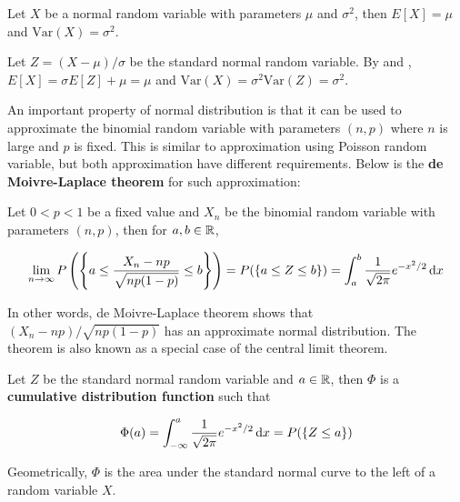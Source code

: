 \documentclass[a4paper,12pt]{article}
\begin{document}
\begin{thm}
  Let $X$ be a normal random variable with parameters $\mu$ and $\sigma^{2}$, then $E[X]=\mu$ and $\mathrm{Var}(X)=\sigma^{2}$.\n

  \prf Let $Z=(X-\mu)/\sigma$ be the standard normal random variable. By \rpst[\sctd{2}] and \rpst[\sctd{1}], $E[X]=\sigma E[Z]+\mu=\mu$ and $\mathrm{Var}(X)=\sigma^{2}\mathrm{Var}(Z)=\sigma^{2}$.
\end{thm}\n

An important property of normal distribution is that it can be used to approximate the binomial random variable with parameters $(n,p)$ where $n$ is large and $p$ is fixed. This is similar to approximation using Poisson random variable, but both approximation have different requirements. Below is the \textbf{de Moivre-Laplace theorem} for such approximation:\n

\begin{thm}
  Let $0<p<1$ be a fixed value and $X_{n}$ be the binomial random variable with parameters $(n,p)$, then for $a,b\in\mathbb{R}$,

  $$\lim_{n\to\infty}P\left( \left\{ a\leq\frac{X_{n}-np}{\sqrt{np(1-p)}}\leq b\right\}\right)=P(\left\{ a\leq Z\leq b\right\})=\int_{a}^{b}\frac{1}{\sqrt{2\pi}}e^{-x^{2}/2}\,\mathrm{d} x$$
\end{thm}\n

In other words, de Moivre-Laplace theorem shows that $(X_{n}-np)/\sqrt{np(1-p)}$ has an approximate normal distribution. The theorem is also known as a special case of the central limit theorem.\n

\begin{dft}
  Let $Z$ be the standard normal random variable and $a\in\mathbb{R}$, then $\Phi$ is a \textbf{cumulative distribution function} such that

  $$\Phi(a)=\int_{-\infty}^{a}\frac{1}{\sqrt{2\pi}}e^{-x^{2}/2}\,\mathrm{d} x=P(\left\{ Z\leq a\right\})$$
\end{dft}\n

Geometrically, $\Phi$ is the area under the standard normal curve to the left of a random variable $X$.
\end{document}
